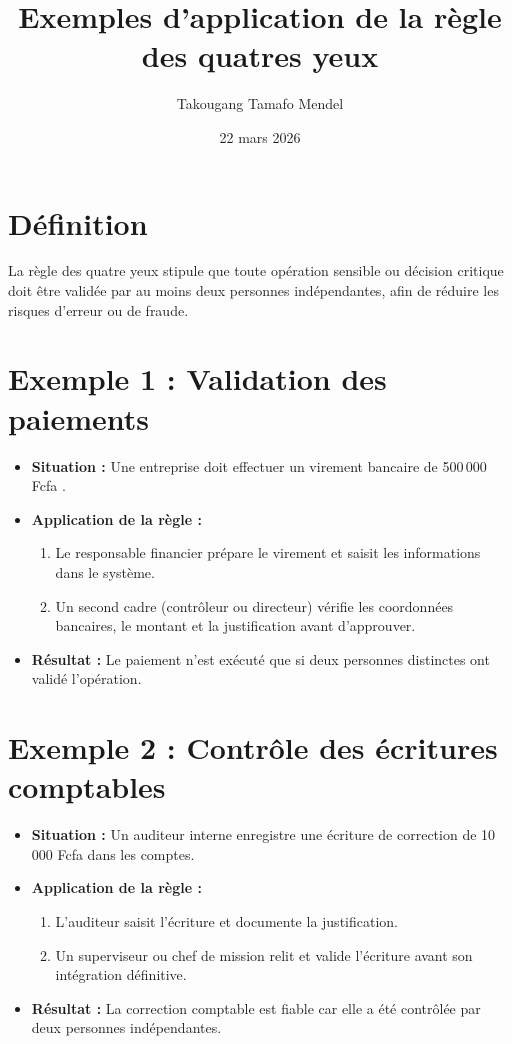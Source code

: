 \documentclass{article}
\title{Exemples d'application de la règle des quatres yeux }
\author{Takougang Tamafo Mendel}
\date{22 mars 2026}
\begin{document}
\maketitle

\section*{Définition}
La règle des quatre yeux stipule que toute opération sensible ou décision critique doit être validée par au moins deux personnes indépendantes, afin de réduire les risques d'erreur ou de fraude.

\section*{Exemple 1 : Validation des paiements}
\begin{itemize}[label=--]
    \item \textbf{Situation :} Une entreprise doit effectuer un virement bancaire de 500\,000 Fcfa .
    \item \textbf{Application de la règle :} 
    \begin{enumerate}
        \item Le responsable financier prépare le virement et saisit les informations dans le système.
        \item Un second cadre (contrôleur ou directeur) vérifie les coordonnées bancaires, le montant et la justification avant d’approuver.
    \end{enumerate}
    \item \textbf{Résultat :} Le paiement n’est exécuté que si deux personnes distinctes ont validé l’opération.
\end{itemize}

\section*{Exemple 2 : Contrôle des écritures comptables}
\begin{itemize}[label=--]
    \item \textbf{Situation :} Un auditeur interne enregistre une écriture de correction de 10\,000 Fcfa dans les comptes.
    \item \textbf{Application de la règle :}
    \begin{enumerate}
        \item L’auditeur saisit l’écriture et documente la justification.
        \item Un superviseur ou chef de mission relit et valide l’écriture avant son intégration définitive.
    \end{enumerate}
    \item \textbf{Résultat :} La correction comptable est fiable car elle a été contrôlée par deux personnes indépendantes.
\end{itemize}
\end{document}
